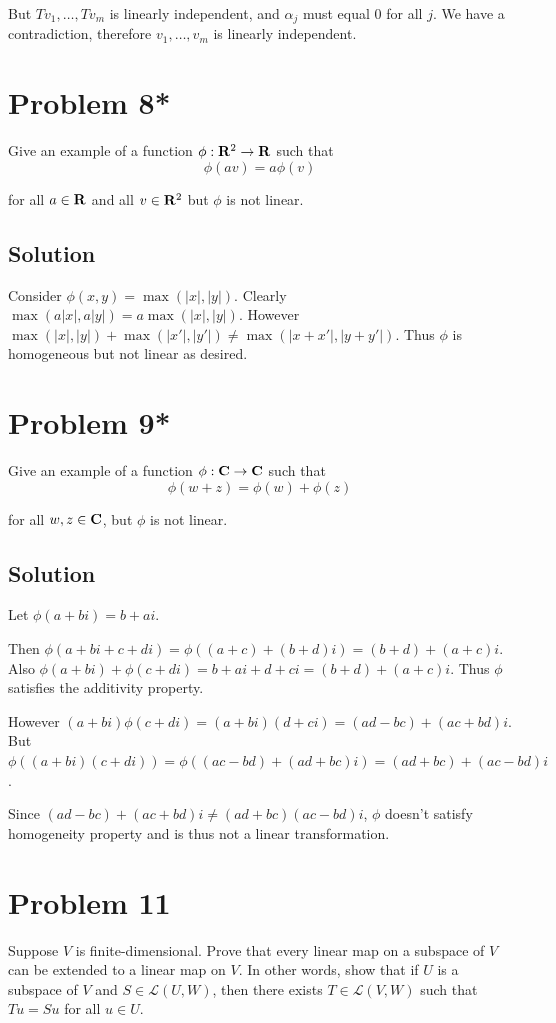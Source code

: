 \documentclass{article}
\begin{document}
But $Tv_1, \ldots, Tv_m$ is linearly independent, and $\alpha_j$ must equal $0$ for all $j$. We have a contradiction, therefore $v_1,\ldots,v_m$ is linearly independent.

\section*{Problem 8*}
Give an example of a function $\phi:\mathbf{R}^2\to\mathbf{R}$ such that
\[\phi(av)=a\phi(v)\]

for all $a\in\mathbf{R}$ and all $v\in\mathbf{R}^2$ but $\phi$ is not linear.

\subsection*{Solution}
Consider $\phi(x, y)=\max(\lvert x\rvert, \lvert y\rvert)$. Clearly $\max(a\lvert x\rvert, a\lvert y\rvert)=a\max(\lvert x\rvert, \lvert y\rvert)$. However $\max(\lvert x\rvert, \lvert y\rvert) + \max(\lvert x'\rvert, \lvert y'\rvert)\neq \max(\lvert x+x'\rvert, \lvert y+y'\rvert)$. Thus $\phi$ is homogeneous but not linear as desired.

\section*{Problem 9*}
Give an example of a function $\phi:\mathbf{C}\to\mathbf{C}$ such that
\[\phi(w+z)=\phi(w)+\phi(z)\]

for all $w,z\in\mathbf{C}$, but $\phi$ is not linear.

\subsection*{Solution}
Let $\phi(a+bi)=b+ai$.

\vs

Then $\phi(a+bi + c+di)=\phi((a+c)+(b+d)i)=(b+d)+(a+c)i$. Also $\phi(a+bi) + \phi(c+di)=b+ai + d+ci=(b+d) + (a+c)i$. Thus $\phi$ satisfies the additivity property.

\vs

However $(a+bi)\phi(c+di)=(a+bi)(d+ci)=(ad-bc)+(ac+bd)i$. But $\phi((a+bi)(c+di))=\phi((ac-bd)+(ad+bc)i)=(ad+bc)+(ac-bd)i$.

\vs

Since $(ad-bc)+(ac+bd)i\neq (ad+bc)(ac-bd)i$, $\phi$ doesn't satisfy homogeneity property and is thus not a linear transformation.

\section*{Problem 11}
Suppose $V$ is finite-dimensional. Prove that every linear map on a subspace of $V$ can be extended to a linear map on $V$. In other words, show that if $U$ is a subspace of $V$ and $S\in\mathcal{L}(U, W)$, then there exists $T\in\mathcal{L}(V, W)$ such that $Tu=Su$ for all $u\in U$.
\end{document}
